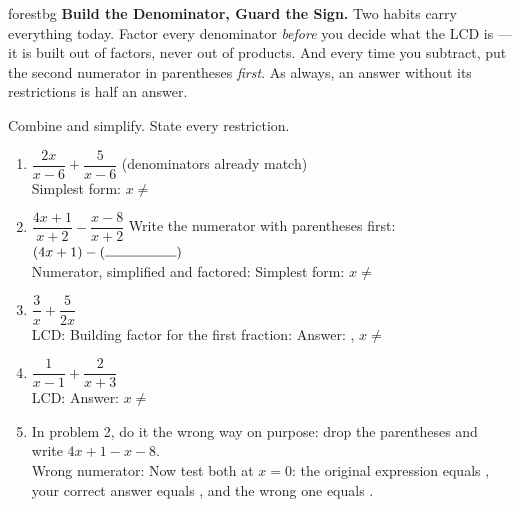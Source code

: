 \documentclass[10pt]{article}
\begin{document}
\namepartnerperiod

\vspace{0.08in}

\begin{headlinebox}{forestbg}
\small\textbf{Build the Denominator, Guard the Sign.} Two habits carry everything today. Factor every
denominator \emph{before} you decide what the LCD is --- it is built out of factors, never out of
products. And every time you subtract, put the second numerator in parentheses \emph{first}. As always,
an answer without its restrictions is half an answer.
\end{headlinebox}

\vspace{0.06in}

\begin{tcolorbox}[colback=white, colframe=black!40, title=\textbf{Tier R --- Remediate},
    fonttitle=\bfseries, arc=1.5mm, left=3mm, right=3mm, top=2mm, bottom=2mm, breakable]
Combine and simplify. State every restriction.

\vspace{4pt}
\begin{enumerate}[leftmargin=1.9em, itemsep=9pt]
  \item $\dfrac{2x}{x-6}+\dfrac{5}{x-6}$ \; (denominators already match) \\[3pt]
        Simplest form: \blank{2.2cm} \quad $x\neq$ \blank{1.2cm}
  \item $\dfrac{4x+1}{x+2}-\dfrac{x-8}{x+2}$ \; Write the numerator with parentheses first:
        $(4x+1)-(\rule{1.8cm}{0.4pt})$ \\[3pt]
        Numerator, simplified and factored: \blank{2.6cm} \quad Simplest form: \blank{2.4cm}
        \quad $x\neq$ \blank{1.2cm}
  \item $\dfrac{3}{x}+\dfrac{5}{2x}$ \\[3pt]
        LCD: \blank{1.4cm} \quad Building factor for the first fraction: \blank{1.2cm} \quad
        Answer: \blank{1.8cm}, \; $x\neq$ \blank{1.0cm}
  \item $\dfrac{1}{x-1}+\dfrac{2}{x+3}$ \\[3pt]
        LCD: \blank{2.6cm} \quad Answer: \blank{3.0cm} \quad $x\neq$ \blank{1.8cm}
  \item In problem 2, do it the wrong way on purpose: drop the parentheses and write
        $4x+1-x-8$. \\[3pt]
        Wrong numerator: \blank{1.8cm} \quad Now test both at $x=0$: the original expression equals
        \blank{1.2cm}, your correct answer equals \blank{1.2cm}, and the wrong one equals
        \blank{1.2cm}.
\end{enumerate}
\end{tcolorbox}
\end{document}
